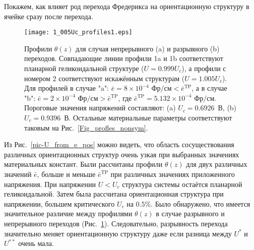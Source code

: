 Покажем, как влияет род перехода Фредерикса на ориентационную структуру в ячейке сразу после перехода.
\begin{figure}%
	\hspace{0cm}
	\centering
	\texttt{[image: 1\_005Uc\_profiles1.eps]}
	\caption{Профили $\theta(z)$ для случая непрерывного (a) и разрывного (b) переходов.
		Совпадающие линии профили 1a и 1b соответствуют планарной геликоидальной структуре ($U = 0.999 U_c$), а профили с номером 2 соответствуют искажённым структурам ($U = 1.005 U_c$).
		Для профилей в случае "a": $\bar{e} = 8\times 10^{-4}\text{~Фр/см}<\bar{e}^\text{TP}$, а в случае "b": $\bar{e} = 2\times 10^{-4}\text{~Фр/см}>\bar{e}^\text{TP}$, где $\bar{e}^\mathrm{TP}=5.132\times10^{-4}\text{~Фр/см}$.
		Пороговые значения напряжений составляют: (a) $U_c=0.6926$~В, (b)  $U_c=0.9396$~В.
		Остальные материальные параметры соответствуют таковым на Рис.~\ref{Fig_profles_nonsym}. }
	\label{figCont_Discont_profiles}
\end{figure}
Из Рис.~\ref{pic-U_from_e_pos} можно видеть, что область сосуществования различных ориентационных структур очень узкая при выбранных значениях материальных констант.
Были рассчитаны профили $\theta(z)$ для двух различных значений $\bar{e}$, больше и меньше $\bar{e}^\text{TP}$ при различных значениях приложенного напряжения.
При напряжении $U < U_c$ структура системы остаётся планарной геликоидальной.
Затем была рассчитана ориентационная структура при напряжении, большем критического $U_c$ на $0.5\%$.
Было обнаружено, что имеется значительное различие между профилями $\theta(z)$ в случае разрывного и непрерывного переходов (Рис.~\ref{figCont_Discont_profiles}).
Следовательно, разрывность перехода значительно меняет ориентационную структуру даже если разница между $U^*$ и $U^{**}$ очень мала.

